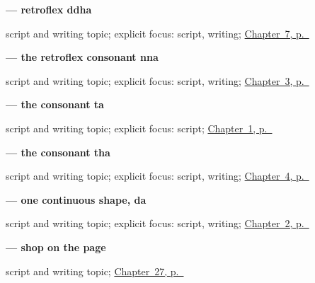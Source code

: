 \noindent\begin{minipage}[t]{\linewidth}
\raggedright
\textbf{ — retroflex ddha}\par
\footnotesize script and writing topic; explicit focus: script, writing; \hyperref[ch:gu-final-script-closure-b]{Chapter~7, p.~\pageref*{ch:gu-final-script-closure-b}}
\end{minipage}\par\smallskip

\noindent\begin{minipage}[t]{\linewidth}
\raggedright
\textbf{ — the retroflex consonant nna}\par
\footnotesize script and writing topic; explicit focus: script, writing; \hyperref[ch:gu-doorway-forms]{Chapter~3, p.~\pageref*{ch:gu-doorway-forms}}
\end{minipage}\par\smallskip

\noindent\begin{minipage}[t]{\linewidth}
\raggedright
\textbf{ — the consonant ta}\par
\footnotesize script and writing topic; explicit focus: script; \hyperref[ch:first-greeting-script]{Chapter~1, p.~\pageref*{ch:first-greeting-script}}
\end{minipage}\par\smallskip

\noindent\begin{minipage}[t]{\linewidth}
\raggedright
\textbf{ — the consonant tha}\par
\footnotesize script and writing topic; explicit focus: script, writing; \hyperref[ch:gu-first-use-forms-a]{Chapter~4, p.~\pageref*{ch:gu-first-use-forms-a}}
\end{minipage}\par\smallskip

\noindent\begin{minipage}[t]{\linewidth}
\raggedright
\textbf{ — one continuous shape, da}\par
\footnotesize script and writing topic; explicit focus: script, writing; \hyperref[ch:greetings]{Chapter~2, p.~\pageref*{ch:greetings}}
\end{minipage}\par\smallskip

\noindent\begin{minipage}[t]{\linewidth}
\raggedright
\textbf{ — shop on the page}\par
\footnotesize script and writing topic; \hyperref[ch:gu-village-shop-ten]{Chapter~27, p.~\pageref*{ch:gu-village-shop-ten}}
\end{minipage}\par\smallskip

